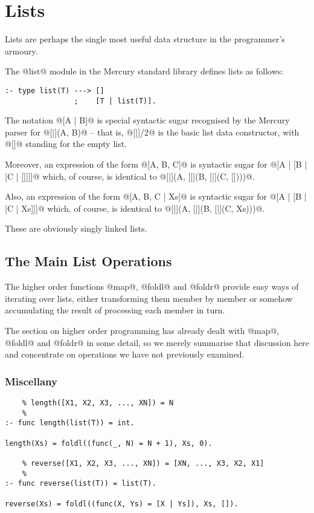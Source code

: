 \section{Lists}

Lists are perhaps the single most useful data structure in the
programmer's armoury.

The @list@ module in the Mercury standard library defines lists as
follows:
\begin{verbatim}
:- type list(T) ---> []
                ;    [T | list(T)].
\end{verbatim}
The notation @[A | B]@ is special syntactic sugar recognised by the
Mercury parser for @[|](A, B)@ -- that is, @[|]/2@ is the basic list
data constructor, with @[]@ standing for the empty list.

Moreover, an expression of the form @[A, B, C]@ is syntactic sugar for
@[A | [B | [C | []]]]@ which, of course, is identical to
@[|](A, [|](B, [|](C, [])))@.

Also, an expression of the form @[A, B, C | Xs]@ is syntactic sugar for
@[A | [B | [C | Xs]]]@ which, of course, is identical to
@[|](A, [|](B, [|](C, Xs)))@.

These are obviously singly linked lists.  

\subsection{The Main List Operations}

The higher order functions @map@, @foldl@ and @foldr@ provide easy ways
of iterating over lists, either transforming them member by member or
somehow accumulating the result of processing each member in turn.

The section on higher order programming \XXX{} has already dealt with
@map@, @foldl@ and @foldr@ in some detail, so we merely summarise that
discussion here and concentrate on operations we have not previously
examined.

\subsubsection{Miscellany}

\begin{verbatim}
    % length([X1, X2, X3, ..., XN]) = N
    %
:- func length(list(T)) = int.

length(Xs) = foldl((func(_, N) = N + 1), Xs, 0).

    % reverse([X1, X2, X3, ..., XN]) = [XN, ..., X3, X2, X1]
    %
:- func reverse(list(T)) = list(T).

reverse(Xs) = foldl((func(X, Ys) = [X | Ys]), Xs, []).
\end{verbatim}

